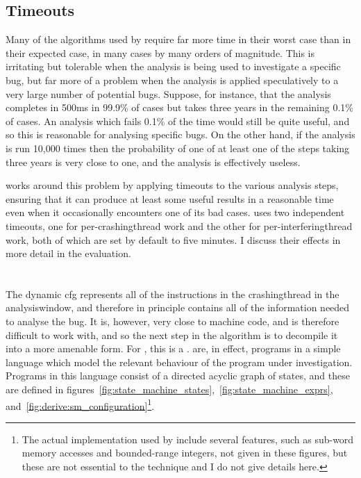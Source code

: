 \subsection{Timeouts}

Many of the algorithms used by {\technique} require far more time in
their worst case than in their expected case, in many cases by many
orders of magnitude.  This is irritating but tolerable when the
analysis is being used to investigate a specific bug, but far more of
a problem when the analysis is applied speculatively to a very large
number of potential bugs.  Suppose, for instance, that the analysis
completes in 500ms in 99.9\% of cases but takes three years in the
remaining 0.1\% of cases.  An analysis which fails 0.1\% of the time
would still be quite useful, and so this is reasonable for analysing
specific bugs.  On the other hand, if the analysis is run 10,000 times
then the probability of one of at least one of the steps taking three
years is very close to one, and the analysis is effectively useless.

{\Technique} works around this problem by applying timeouts to the
various analysis steps, ensuring that it can produce at least some
useful results in a reasonable time even when it occasionally
encounters one of its bad cases.  {\Implementation} uses two
independent timeouts, one for per-\gls{crashingthread} work and the
other for per-\gls{interferingthread} work, both of which are set by
default to five minutes.  I discuss their effects in more detail in
the evaluation.

\section{\STateMachines}
\label{sect:derive:state_machines}

The dynamic \gls{cfg} represents all of the instructions in the
\gls{crashingthread} in the \gls{analysiswindow}, and therefore in
principle contains all of the information needed to analyse the bug.
It is, however, very close to machine code, and is therefore difficult
to work with, and so the next step in the algorithm is to decompile it
into a more amenable form.  For {\technique}, this is a
{\StateMachine}.  {\STateMachines} are, in effect, programs in a
simple language which model the relevant behaviour of the program
under investigation.  Programs in this language consist of a directed
acyclic graph of states, and these are defined in
figures~\ref{fig:state_machine_states},~\ref{fig:state_machine_exprs},
and~\ref{fig:derive:sm_configuration}\footnote{The actual
  implementation used by {\implementation} include several features,
  such as sub-word memory accesses and bounded-range integers, not
  given in these figures, but these are not essential to the
  {\technique} technique and I do not give details here.}.

